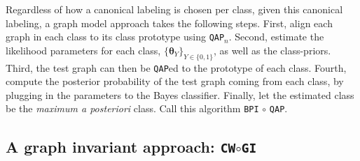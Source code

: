 \documentclass{article} %
\providecommand{\ve}[1]{\boldsymbol{#1}}
\newcommand{\bth}{\ve{\theta}}
\begin{document}
Regardless of how a canonical labeling is chosen per class, given this canonical labeling, a graph model approach takes the following steps.  First, align each graph in each class to its class prototype using \texttt{QAP}$_n$.  Second, estimate the likelihood parameters for each class, $\{\bth_Y\}_{Y \in \{0,1\}}$, as well as the class-priors. Third, the test graph can then be \texttt{QAP}ed to the prototype of each class.  Fourth, compute the posterior probability of the test graph coming from each class, by plugging in the parameters to the Bayes classifier.  Finally, let the estimated class be the \emph{maximum a posteriori} class.  Call this algorithm \texttt{BPI} $\circ$ \texttt{QAP}.




\subsection{A graph invariant approach: \texttt{CW}$\circ$\texttt{GI} } %
\label{sub:graph_invariant_approach}
\end{document}
